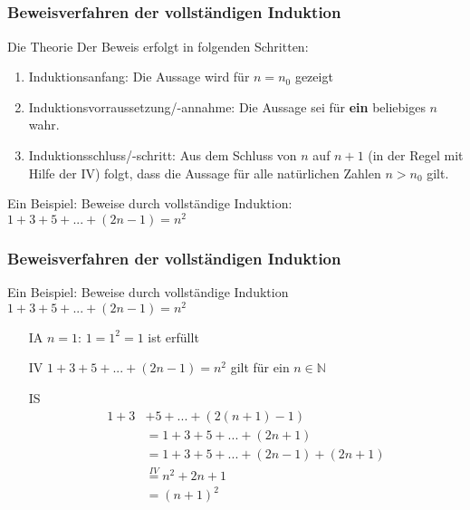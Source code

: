 \subsection*{}
\begin{frame}
	\frametitle{Beweisverfahren der vollständigen Induktion}
	\begin{block}{Die Theorie}
		Der Beweis erfolgt in folgenden Schritten:
		\begin{enumerate}
			\item Induktionsanfang: Die Aussage wird für $n=n_0$ gezeigt \pause
			\item Induktionsvorraussetzung/-annahme: Die Aussage sei für \textbf{ein}
			beliebiges  $n$ wahr. \pause
			\item Induktionsschluss/-schritt: Aus dem Schluss von $n$ auf $n+1$ (in der Regel mit Hilfe der IV) folgt, dass die Aussage für alle natürlichen Zahlen $n>n_0$ gilt.
		\end{enumerate}
	\end{block}

	\begin{block}{Ein Beispiel:}
	Beweise durch vollständige Induktion: 
	 $1+3+5+...+(2n-1)=n^2$
	\end{block}
	
\end{frame}

\begin{frame}
	\frametitle{Beweisverfahren der vollständigen Induktion}
	
	\begin{block}{Ein Beispiel:}
	Beweise durch vollständige Induktion $1+3+5+...+(2n-1)=n^2$
	
	\begin{itemize}
		\item[IA] $n=1$: $1=1^2=1$ ist erfüllt
		\item[IV]	$1+3+5+...+(2n-1)=n^2$ gilt für ein $n \in \mathbb{N}$
		\item[IS] \begin{equation}
				\begin{split}
					 1+3&+5+...+(2(n+1)-1) \nonumber\\
					&= 1+3+5+...+(2n+1) \nonumber\\
					&=1+3+5+...+(2n-1)+(2n+1) \nonumber\\
					&\overset{IV}{=} n^2+2n+1 \nonumber\\
					&=(n+1)^2
				\end{split}
			\end{equation}
    \end{itemize}
    \end{block}
	
\end{frame}

